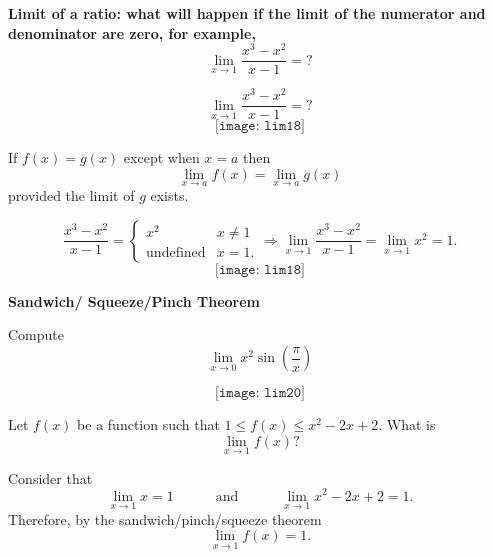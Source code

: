 \documentclass{beamer}
\begin{document}
\begin{frame}
\begin{center}
	 		{\bf \Large  \color{blue} Limit of a ratio: what will happen if the limit of the numerator and denominator are zero,
	 		for example, $$ \lim_{x\to 1} \frac{x^3-x^2}{x-1}=?$$}
 		\end{center}
\end{frame}

\begin{frame}
$$\lim_{x \to 1} \frac{x^3-x^2}{x-1}=?$$
	$$
\texttt{[image: lim18]}
$$
\end{frame}

\begin{frame}
\begin{tcolorbox}[width=\textwidth,colback={blue!10},title={},colbacktitle=yellow,coltitle=blue] 
\begin{theorem}
	If $f(x)=g(x)$ except when $x=a$ then $$\lim_{x\to a} f(x)=\lim_{x\to a} g(x)$$ provided the limit of $g$ exists. 
\end{theorem}
\end{tcolorbox}
		$$ \frac{x^3-x^2}{x-1}=\begin{cases}
	x^2 & x\neq 1\\
	\text{undefined} & x=1.
	\end{cases} \Rightarrow  \lim_{x\to 1} \frac{x^3-x^2}{x-1}=\lim_{x\to 1} {x^2}=1. 
	$$
	$$
\texttt{[image: lim18]}
$$
\end{frame}

\begin{frame}
\begin{center}
	{\bf \Large \color{blue} Sandwich/ Squeeze/Pinch Theorem}
\end{center}
\end{frame}

\begin{frame}

\begin{Example}
	Compute 
	$$\lim_{x\to 0} x^2\sin(\frac{\pi}{x})$$
\end{Example}
$$
\texttt{[image: lim20]}
$$
\end{frame}


\begin{frame}

\begin{Example}
	Let $f(x)$ be a function such that $1\leq f(x)\leq x^2-2x+2$. What is 
	$$\lim_{x\to 1}f(x)?$$
\end{Example}
\pause 
\begin{solution}
	Consider that 
	$$\lim_{x\to 1}x=1\quad \quad \quad \text{and}\quad \quad \quad \lim_{x\to 1}x^2-2x+2=1.$$
	Therefore, by the sandwich/pinch/squeeze theorem 
	$$\lim_{x\to 1}f(x)=1.$$
\end{solution}
\end{frame}
\end{document}
